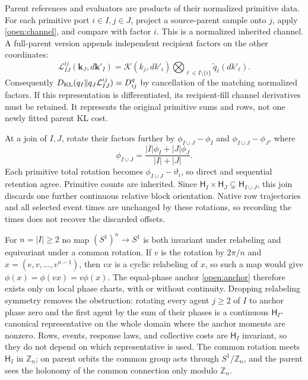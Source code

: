 Parent references and evaluators are products of their normalized primitive data. For each primitive port $i\in I,j\in J$, project a source-parent sample onto $j$, apply \cref{open:channel}, and compare with factor $i$. This is a normalized inherited channel. A full-parent version appends independent recipient factors on the other coordinates:
\begin{equation}
\mathcal L_{IJ}^{ij}(\boldsymbol k_J,d\boldsymbol k'_I)
=\mathcal K(k_j,dk'_i)
\bigotimes_{\ell\in I\setminus\{i\}}\widetilde q_\ell(dk'_\ell).
\end{equation}
Consequently $D_{\mathrm{KL}}(q_I\|q_J\mathcal L_{IJ}^{ij})=D^q_{ij}$ by cancellation of the matching normalized factors. If this representation is differentiated, its recipient-fill channel derivatives must be retained. It represents the original primitive sums and rows, not one newly fitted parent KL cost.

At a join of $I,J$, rotate their factors further by $\phi_{I\cup J}-\phi_I$ and $\phi_{I\cup J}-\phi_J$, where
\begin{equation}
\phi_{I\cup J}=
\frac{|I|\phi_I+|J|\phi_J}{|I|+|J|}.
\label{open:phase-recursion}
\end{equation}
Each primitive total rotation becomes $\phi_{I\cup J}-\vartheta_i$, so direct and sequential retention agree. Primitive counts are inherited. Since
$\mathsf H_I\times\mathsf H_J\subsetneq\mathsf H_{I\cup J}$,
this join discards one further continuous relative block orientation. Native row trajectories and all selected event times are unchanged by these rotations, so recording the times does not recover the discarded offsets.

For $n=|I|\ge2$ no map $(S^1)^n\to S^1$ is both invariant under relabeling and equivariant under a common rotation. If $v$ is the rotation by $2\pi/n$ and $x=(e,v,\ldots,v^{n-1})$, then $vx$ is a cyclic relabeling of $x$, so such a map would give $\phi(x)=\phi(vx)=v\phi(x)$. The equal-phase anchor \cref{open:anchor} therefore exists only on local phase charts, with or without continuity. Dropping relabeling symmetry removes the obstruction: rotating every agent $j\ge2$ of $I$ to anchor phase zero and the first agent by the sum of their phases is a continuous $\mathsf H_I$-canonical representative on the whole domain where the anchor moments are nonzero. Rows, events, response laws, and collective costs are $\mathsf H_I$ invariant, so they do not depend on which representative is used. The common rotation meets $\mathsf H_I$ in $\mathbb Z_n$; on parent orbits the common group acts through $S^1/\mathbb Z_n$, and the parent sees the holonomy of the common connection only modulo $\mathbb Z_n$.


